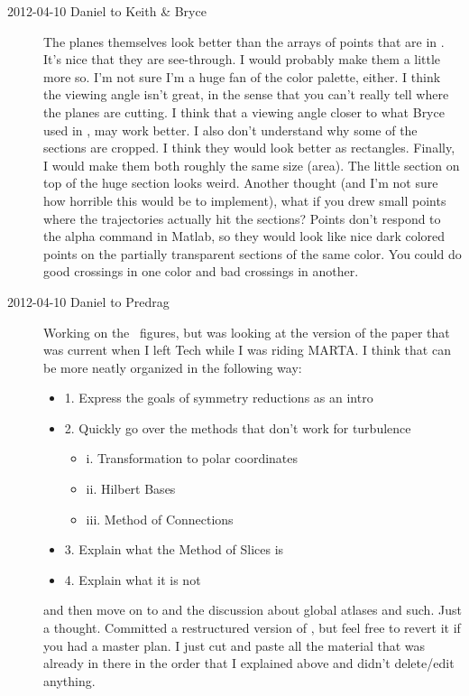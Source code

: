 \begin{description}
\item[2012-04-10 Daniel to Keith \& Bryce] The planes themselves look
better than the arrays of points that are in . It's
nice that they are see-through. I would probably make them a little more
so. I'm not sure I'm a huge fan of the color palette, either. I think the
viewing angle isn't great, in the sense that you can't really tell where
the planes are cutting. I think that a viewing angle closer to what Bryce
used in , may work better. I also don't understand
why some of the sections are cropped. I think they would look better as
rectangles. Finally, I would make them both roughly the same size (area).
The little section on top of the huge section looks weird. Another
thought (and I'm not sure how horrible this would be to implement), what
if you drew small points where the trajectories actually hit the
sections? Points don't respond to the alpha command in Matlab, so they
would look like nice dark colored points on the partially transparent
sections of the same color. You could do good crossings in one color and
bad crossings in another.

\item[2012-04-10 Daniel to Predrag]
Working on the \cLe\ figures, but was looking at the version of the paper
that was current when I left Tech while I was riding MARTA. I think that
 can be more neatly organized in the following way:
      \begin{itemize}
      	\item{1. Express the goals of symmetry reductions as an intro}
      	\item{2. Quickly go over the methods that don't work for turbulence}
      	\begin{itemize}
      		\item{i. Transformation to polar coordinates}
      		\item{ii. Hilbert Bases}
      		\item{iii. Method of Connections}
      	\end{itemize}
      	\item{3. Explain what the Method of Slices is}
      	\item{4. Explain what it is not}
      \end{itemize}
and then move on to  and the discussion about global
atlases and such. Just a thought. Committed a restructured version of
, but feel free to revert it if you had a master plan.
I just cut and paste all the material that was already in there in the
order that I explained above and didn't delete/edit anything.


\end{description}
